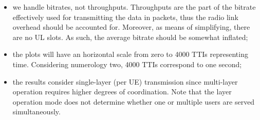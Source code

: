 \begin{itemize}
    \item we handle bitrates, not throughputs. Throughputs are the part of the bitrate effectively used for transmitting the data in packets, thus the radio link overhead should be accounted for. Moreover, as means of simplifying, there are no UL slots. As such, the average bitrate should be somewhat inflated;
    \item the plots will have an horizontal scale from zero to 4000 TTIs representing time. Considering numerology two, 4000 TTIs correspond to one second;
    \item the results consider single-layer (per UE) transmission since multi-layer operation requires higher degrees of coordination. Note that the layer operation mode does not determine whether one or multiple users are served simultaneously.
\end{itemize}


 